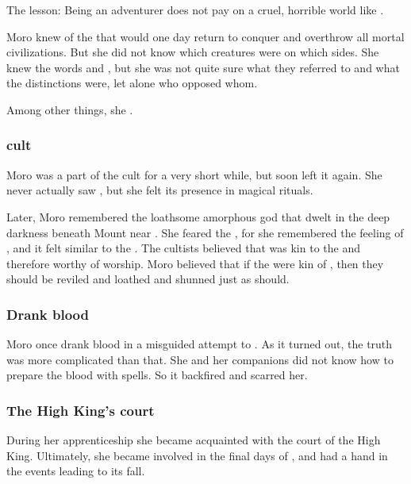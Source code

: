 The lesson: Being an adventurer does not pay on a cruel, horrible world like \Miith.

Moro knew of the  that would one day return to conquer \Miith and overthrow all mortal civilizations. 
But she did not know which creatures were on which sides. 
She knew the words \quo{\xs} and \quo{\bane}, but she was not quite sure what they referred to and what the distinctions were, let alone who opposed whom. 

Among other things, she .





\subsubsection{\Ubloth cult}
Moro was a part of the  cult for a very short while, but soon left it again.
She never actually saw \Ubloth, but she felt its presence in magical rituals. 

Later, Moro remembered the loathsome amorphous god \Ubloth that dwelt in the deep darkness beneath Mount \Shrun near \Yormis. 
She feared the \Primordials, for she remembered the feeling of \Ubloth, and it felt similar to the \Primordials.
The \Ubloth cultists believed that \Ubloth was kin to the \Primordials and therefore worthy of worship.
Moro believed that if the \Primordials were kin of \Ubloth, then they should be reviled and loathed and shunned just as \Ubloth should. 





\subsubsection{Drank \draconian blood}
Moro once drank \dragon blood in a misguided attempt to .
As it turned out, the truth was more complicated than that.
She and her companions did not know how to prepare the \dragon blood with spells.
So it backfired and scarred her.





\subsubsection{The High King's court}
During her apprenticeship she became acquainted with the court of the \Velcadian{} High King. Ultimately, she became involved in the final days of \GreatVelcad, and had a hand in the events leading to its fall. 

